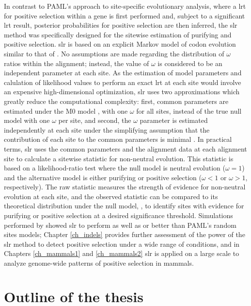 In contrast to PAML's approach to site-specific evolutionary analysis,
where a \ac{lrt} for positive selection within a gene is first
performed and, subject to a significant \ac{lrt} result, \sw posterior
probabilities for positive selection are then inferred, the \ac{slr}
method \citep{Massingham2005} was specifically designed for the
sitewise estimation of purifying and positive selection. \ac{slr} is
based on an explicit Markov model of codon evolution similar to that
of \citet{Goldman1994}. No assumptions are made regarding the
distribution of $\omega$ ratios within the alignment; instead, the
value of $\omega$ is considered to be an independent parameter at each
site. As the estimation of model parameters and calulation of
likelihood values to perform an exact \ac{lrt} at each site would
involve an expensive high-dimensional optimization, \ac{slr} uses two
approximations which greatly reduce the computational complexity:
first, common parameters are estimated under the M0 model
\citep{Yang2000CodonSubstitution}, with one $\omega$ for all sites,
instead of the true null model with one $\omega$ per site, and second,
the \sw $\omega$ parameter is estimated independently at each site
under the simplifying assumption that the contribution of each site to
the common parameters is minimal \citep{Massingham2005}. In practical
terms, \ac{slr} uses the common parameters and the alignment data at
each alignment site to calculate a sitewise statistic for non-neutral
evolution. This statistic is based on a likelihood-ratio test where
the null model is neutral evolution ($\omega=1$) and the alternative
model is either purifying or positive selection ($\omega<1$ or
$\omega>1$, respectively). The raw statistic measures the strength of
evidence for non-neutral evolution at each site, and the observed
statistic can be compared to its theoretical distribution under the
null model, \chisq, to identify sites with evidence for purifying or
positive selection at a desired significance threshold. Simulations
performed by \citet{Massingham2005} showed \ac{slr} to perform as well
as or better than PAML’s random sites models; Chapter \ref{ch_indels}
provides further assessment of the power of the \ac{slr} method to
detect \sw positive selection under a wide range of conditions, and in
Chapters \ref{ch_mammals1} and \ref{ch_mammals2} \ac{slr} is applied
on a large scale to analyze genome-wide patterns of \sw positive
selection in mammals.

\section{Outline of the thesis}

